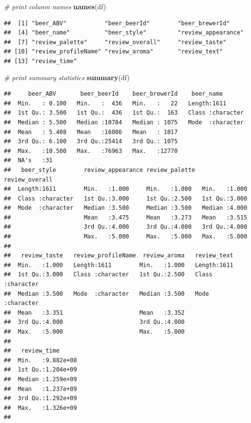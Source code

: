 \documentclass[
  a4paper,
]{article}
\newenvironment{Shaded}{\begin{snugshade}}{\end{snugshade}}
\newcommand{\CommentTok}[1]{\textcolor[rgb]{0.56,0.35,0.01}{\textit{#1}}}
\newcommand{\FunctionTok}[1]{\textcolor[rgb]{0.13,0.29,0.53}{\textbf{#1}}}
\newcommand{\NormalTok}[1]{#1}
\begin{document}
\begin{Shaded}
\begin{Highlighting}[]
\CommentTok{\# print column names}
\FunctionTok{names}\NormalTok{(df)}
\end{Highlighting}
\end{Shaded}

\begin{verbatim}
##  [1] "beer_ABV"           "beer_beerId"        "beer_brewerId"     
##  [4] "beer_name"          "beer_style"         "review_appearance" 
##  [7] "review_palette"     "review_overall"     "review_taste"      
## [10] "review_profileName" "review_aroma"       "review_text"       
## [13] "review_time"
\end{verbatim}

\begin{Shaded}
\begin{Highlighting}[]
\CommentTok{\# print summary statistics}
\FunctionTok{summary}\NormalTok{(df)}
\end{Highlighting}
\end{Shaded}

\begin{verbatim}
##     beer_ABV       beer_beerId    beer_brewerId    beer_name        
##  Min.   : 0.100   Min.   :  436   Min.   :   22   Length:1611       
##  1st Qu.: 3.500   1st Qu.:  436   1st Qu.:  163   Class :character  
##  Median : 5.500   Median :10784   Median : 1075   Mode  :character  
##  Mean   : 5.408   Mean   :16086   Mean   : 1017                     
##  3rd Qu.: 6.100   3rd Qu.:25414   3rd Qu.: 1075                     
##  Max.   :10.500   Max.   :76963   Max.   :12770                     
##  NA's   :31                                                         
##   beer_style        review_appearance review_palette  review_overall 
##  Length:1611        Min.   :1.000     Min.   :1.000   Min.   :1.000  
##  Class :character   1st Qu.:3.000     1st Qu.:2.500   1st Qu.:3.000  
##  Mode  :character   Median :3.500     Median :3.500   Median :4.000  
##                     Mean   :3.475     Mean   :3.273   Mean   :3.515  
##                     3rd Qu.:4.000     3rd Qu.:4.000   3rd Qu.:4.000  
##                     Max.   :5.000     Max.   :5.000   Max.   :5.000  
##                                                                      
##   review_taste   review_profileName  review_aroma   review_text       
##  Min.   :1.000   Length:1611        Min.   :1.000   Length:1611       
##  1st Qu.:3.000   Class :character   1st Qu.:2.500   Class :character  
##  Median :3.500   Mode  :character   Median :3.500   Mode  :character  
##  Mean   :3.351                      Mean   :3.352                     
##  3rd Qu.:4.000                      3rd Qu.:4.000                     
##  Max.   :5.000                      Max.   :5.000                     
##                                                                       
##   review_time       
##  Min.   :9.882e+08  
##  1st Qu.:1.204e+09  
##  Median :1.259e+09  
##  Mean   :1.237e+09  
##  3rd Qu.:1.292e+09  
##  Max.   :1.326e+09  
## 
\end{verbatim}
\end{document}
